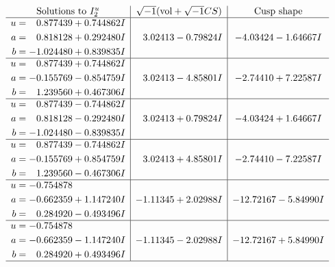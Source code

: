 \documentclass[1p]{elsarticle_modified}
\theoremstyle{definition}
\newcommand{\I}{\sqrt{-1}}
\begin{document}
$$\begin{array}{c|c|c}  
\text{Solutions to }I^u_{2}& \I (\text{vol} + \sqrt{-1}CS) & \text{Cusp shape}\\
 \hline 
\begin{aligned}
u &= \phantom{-}0.877439 + 0.744862 I \\
a &= \phantom{-}0.818128 + 0.292480 I \\
b &= -1.024480 + 0.839835 I\end{aligned}
 & \phantom{-}3.02413 - 0.79824 I & -4.03424 - 1.64667 I \\ \hline\begin{aligned}
u &= \phantom{-}0.877439 + 0.744862 I \\
a &= -0.155769 - 0.854759 I \\
b &= \phantom{-}1.239560 + 0.467306 I\end{aligned}
 & \phantom{-}3.02413 - 4.85801 I & -2.74410 + 7.22587 I \\ \hline\begin{aligned}
u &= \phantom{-}0.877439 - 0.744862 I \\
a &= \phantom{-}0.818128 - 0.292480 I \\
b &= -1.024480 - 0.839835 I\end{aligned}
 & \phantom{-}3.02413 + 0.79824 I & -4.03424 + 1.64667 I \\ \hline\begin{aligned}
u &= \phantom{-}0.877439 - 0.744862 I \\
a &= -0.155769 + 0.854759 I \\
b &= \phantom{-}1.239560 - 0.467306 I\end{aligned}
 & \phantom{-}3.02413 + 4.85801 I & -2.74410 - 7.22587 I \\ \hline\begin{aligned}
u &= -0.754878\phantom{ +0.000000I} \\
a &= -0.662359 + 1.147240 I \\
b &= \phantom{-}0.284920 - 0.493496 I\end{aligned}
 & -1.11345 + 2.02988 I & -12.72167 - 5.84990 I \\ \hline\begin{aligned}
u &= -0.754878\phantom{ +0.000000I} \\
a &= -0.662359 - 1.147240 I \\
b &= \phantom{-}0.284920 + 0.493496 I\end{aligned}
 & -1.11345 - 2.02988 I & -12.72167 + 5.84990 I\\
 \hline 
 \end{array}$$\newpage
\end{document}
